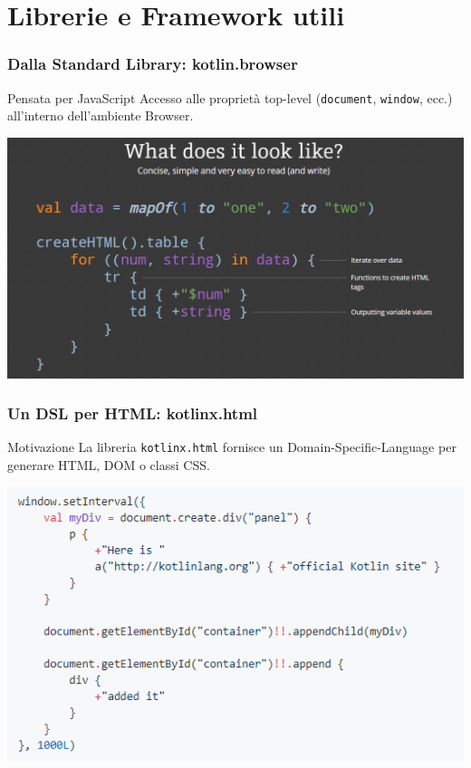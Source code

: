     \section{Librerie e Framework utili}
    \begin{frame}
      \frametitle{Dalla Standard Library: \textbf{kotlin.browser}}
      \begin{block}{Pensata per JavaScript}
        Accesso alle proprietà top-level (\texttt{document}, \texttt{window}, ecc.) all'interno dell'ambiente Browser.
      \end{block}
      \begin{center}
        \includegraphics[scale=0.33]{KotlinHtmlx}
      \end{center}
    \end{frame}

    \begin{frame}
      \frametitle{Un DSL per HTML: \textbf{kotlinx.html}}
      \begin{block}{Motivazione}
        La libreria \texttt{kotlinx.html} fornisce un Domain-Specific-Language per \alert{generare} HTML, DOM o classi CSS.
      \end{block}
      \begin{center}
        \includegraphics[scale=0.67]{KotlinxHtmlEx}
      \end{center}
    \end{frame}

